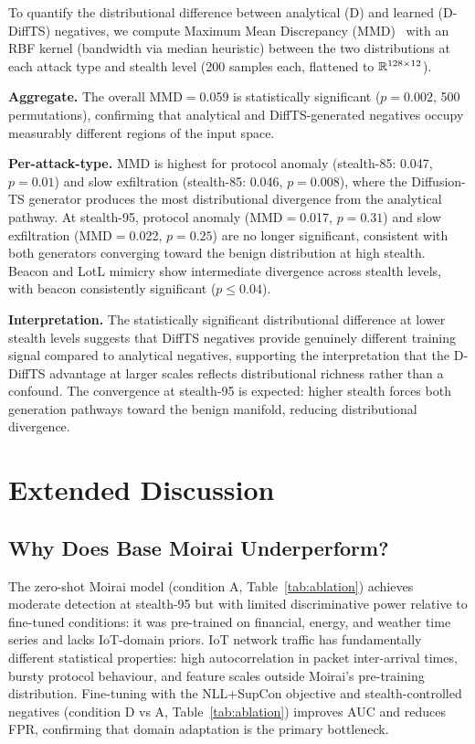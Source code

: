 To quantify the distributional difference between analytical (D) and
learned (D-DiffTS) negatives, we compute Maximum Mean Discrepancy
(MMD)~\cite{gretton2012kernel} with an RBF kernel (bandwidth via
median heuristic) between the two distributions at each attack type
and stealth level (200 samples each, flattened to $\mathbb{R}^{128 \times 12}$).

\textbf{Aggregate.}
The overall MMD$=$0.059 is statistically significant ($p{=}0.002$,
500 permutations), confirming that analytical and DiffTS-generated
negatives occupy measurably different regions of the input space.

\textbf{Per-attack-type.}
MMD is highest for protocol anomaly (stealth-85: 0.047, $p{=}0.01$)
and slow exfiltration (stealth-85: 0.046, $p{=}0.008$), where the
Diffusion-TS generator produces the most distributional divergence from
the analytical pathway.
At stealth-95, protocol anomaly (MMD$=$0.017, $p{=}0.31$) and
slow exfiltration (MMD$=$0.022, $p{=}0.25$) are no longer significant,
consistent with both generators converging toward the benign distribution
at high stealth.
Beacon and LotL mimicry show intermediate divergence across stealth levels,
with beacon consistently significant ($p \leq 0.04$).

\textbf{Interpretation.}
The statistically significant distributional difference at lower stealth
levels suggests that DiffTS negatives provide genuinely different training
signal compared to analytical negatives, supporting the interpretation
that the D-DiffTS advantage at larger scales reflects distributional
richness rather than a confound.
The convergence at stealth-95 is expected: higher stealth forces both
generation pathways toward the benign manifold, reducing distributional
divergence.

\section{Extended Discussion}
\label{app:extended_discussion}

\subsection{Why Does Base Moirai Underperform?}
\label{app:moirai_underperform}

The zero-shot Moirai model (condition A, Table~\ref{tab:ablation})
achieves moderate detection at stealth-95 but with limited discriminative power
relative to fine-tuned conditions:
it was pre-trained on financial, energy, and weather time series and
lacks IoT-domain priors.
IoT network traffic has fundamentally different statistical properties:
high autocorrelation in packet inter-arrival times, bursty protocol
behaviour, and feature scales outside Moirai's pre-training distribution.
Fine-tuning with the NLL$+$SupCon objective and stealth-controlled negatives
(condition D vs A, Table~\ref{tab:ablation}) improves AUC and reduces FPR,
confirming that domain adaptation is the primary bottleneck.


